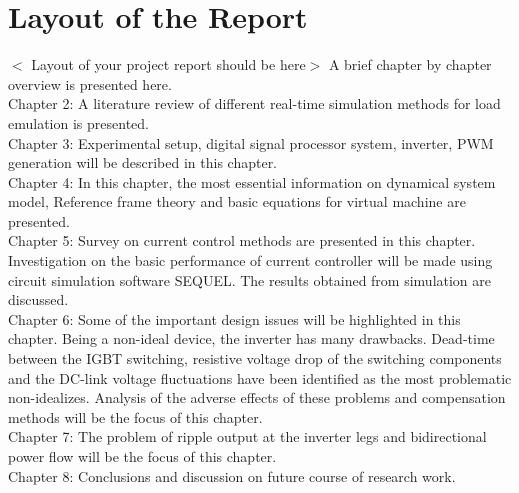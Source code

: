 \section{Layout of the Report} 
$<$ Layout of your project report should be here$>$\newline
A brief chapter by chapter overview is presented here.\\
Chapter 2: A literature review of different real-time simulation methods for load emulation is presented.  \\
Chapter 3: Experimental setup, digital signal processor system, inverter, PWM generation will be described in this chapter.\\
Chapter 4: In this chapter, the most essential information on dynamical system model, Reference frame theory and basic equations for virtual machine are presented.  \\
Chapter 5: Survey on current control methods are presented in this chapter. Investigation on the basic performance of current controller will be made using circuit simulation software SEQUEL. The results obtained from simulation are discussed.\\
Chapter 6: Some of the important design issues will be highlighted in this chapter. Being a non-ideal device, the inverter has many drawbacks. Dead-time between the IGBT switching, resistive voltage drop of the switching components and the DC-link voltage fluctuations have been identified as the most problematic non-idealizes. Analysis of the adverse effects of these problems and compensation methods will be the focus of this chapter.\\
Chapter 7:  The problem of ripple output at the inverter legs and bidirectional power flow  will be the focus of this chapter.\\
Chapter 8: Conclusions and discussion on future course of research work.\\
